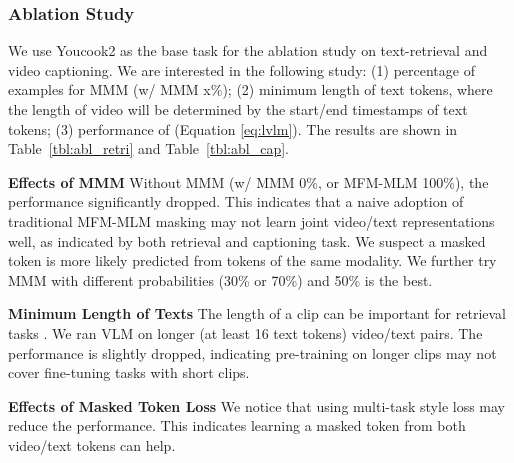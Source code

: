 \documentclass[11pt,a4paper]{article}
\begin{document}
\subsubsection{Ablation Study}
We use Youcook2 as the base task for the ablation study on text-retrieval and video captioning. 
We are interested in the following study:
(1) percentage of examples for MMM (w/ MMM x\%);
(2) minimum length of text tokens, where the length of video will be determined by the start/end timestamps of text tokens;
(3) performance of  (Equation \ref{eq:lvlm}).
The results are shown in Table~\ref{tbl:abl_retri} and Table~\ref{tbl:abl_cap}.

\noindent \textbf{Effects of MMM} Without MMM (w/ MMM 0\%, or MFM-MLM 100\%), the performance significantly dropped. This indicates that a naive adoption of traditional MFM-MLM masking may not learn joint video/text representations well, as indicated by both retrieval and captioning task. We suspect a masked token is more likely predicted from tokens of the same modality.
We further try MMM with different probabilities (30\% or 70\%) and 50\% is the best.

\noindent \textbf{Minimum Length of Texts} The length of a clip can be important for retrieval tasks \cite{miech2020end}. We ran VLM on longer (at least 16 text tokens) video/text pairs. The performance is slightly dropped, indicating pre-training on longer clips may not cover fine-tuning tasks with short clips.

\noindent \textbf{Effects of Masked Token Loss} We notice that using multi-task style loss  may reduce the performance. This indicates learning a masked token from both video/text tokens can help.


\begin{table}[!htbp]
\centering
{}



\caption{Ablation study of VLM for text-based video retrieval on Youcook2.}
\label{tbl:abl_retri}
\end{table}
\end{document}

